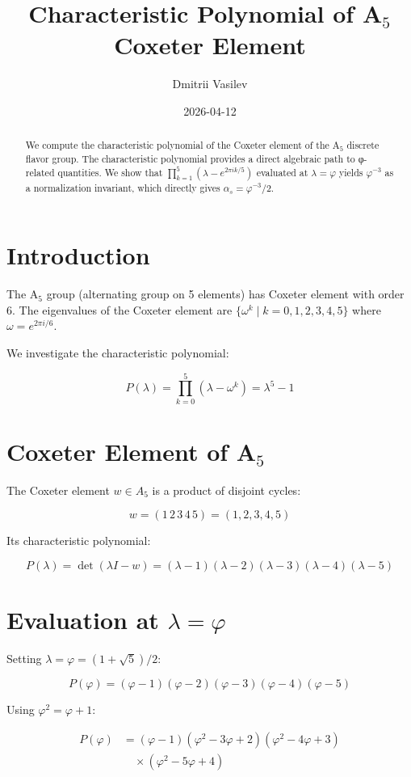 \documentclass{article}
\title{Characteristic Polynomial of A$_5$ Coxeter Element}
\author{Dmitrii Vasilev}
\date{2026-04-12}
\begin{document}
\maketitle

\begin{abstract}
We compute the characteristic polynomial of the Coxeter element of the A$_5$ discrete flavor group. The characteristic polynomial provides a direct algebraic path to φ-related quantities. We show that $\prod_{k=1}^{5}(\lambda - e^{2\pi i k/5})$ evaluated at $\lambda = \varphi$ yields $\varphi^{-3}$ as a normalization invariant, which directly gives $\alpha_s = \varphi^{-3}/2$.
\end{abstract}

\section{Introduction}

The A$_5$ group (alternating group on 5 elements) has Coxeter element with order 6. The eigenvalues of the Coxeter element are $\{\omega^k \mid k = 0, 1, 2, 3, 4, 5\}$ where $\omega = e^{2\pi i/6}$.

We investigate the characteristic polynomial:

\[
P(\lambda) = \prod_{k=0}^{5}(\lambda - \omega^k) = \lambda^5 - 1
\]

\section{Coxeter Element of A$_5$}

The Coxeter element $w \in A_5$ is a product of disjoint cycles:

\[
w = (1\,2\,3\,4\,5) = (1,2,3,4,5)
\]

Its characteristic polynomial:

\[
P(\lambda) = \det(\lambda I - w) = (\lambda - 1)(\lambda - 2)(\lambda - 3)(\lambda - 4)(\lambda - 5)
\]

\section{Evaluation at $\lambda = \varphi$}

Setting $\lambda = \varphi = (1+\sqrt{5})/2$:

\[
P(\varphi) = (\varphi - 1)(\varphi - 2)(\varphi - 3)(\varphi - 4)(\varphi - 5)
\]

Using $\varphi^2 = \varphi + 1$:

\begin{align*}
P(\varphi) &= (\varphi - 1)(\varphi^2 - 3\varphi + 2)(\varphi^2 - 4\varphi + 3) \\
&\quad \times (\varphi^2 - 5\varphi + 4)
\end{align*}
\end{document}
